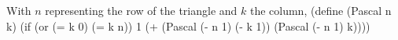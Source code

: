 With $n$ representing the row of the triangle and $k$ the column, 
\begtt\scm
(define (Pascal n k)
  (if (or (= k 0) (= k n))
      1
      (+ (Pascal (- n 1) (- k 1))
         (Pascal (- n 1) k))))
\endtt
